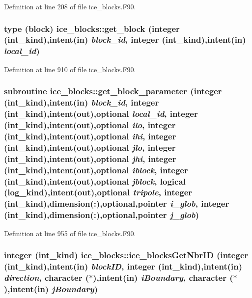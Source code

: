 Definition at line 208 of file ice\_\-blocks.F90.\hypertarget{namespaceice__blocks_aa79bfef5022683234ed1b332af17f1de}{
\subsubsection[{get\_\-block}]{\setlength{\rightskip}{0pt plus 5cm}type ({\bf block}) ice\_\-blocks::get\_\-block (integer (int\_\-kind),intent(in) {\em block\_\-id}, \/  integer (int\_\-kind),intent(in) {\em local\_\-id})}}
\label{namespaceice__blocks_aa79bfef5022683234ed1b332af17f1de}


Definition at line 910 of file ice\_\-blocks.F90.\hypertarget{namespaceice__blocks_adbbafad5aa62ed6d9fec1934f073d23e}{
\subsubsection[{get\_\-block\_\-parameter}]{\setlength{\rightskip}{0pt plus 5cm}subroutine ice\_\-blocks::get\_\-block\_\-parameter (integer (int\_\-kind),intent(in) {\em block\_\-id}, \/  integer (int\_\-kind),intent(out),optional {\em local\_\-id}, \/  integer (int\_\-kind),intent(out),optional {\em ilo}, \/  integer (int\_\-kind),intent(out),optional {\em ihi}, \/  integer (int\_\-kind),intent(out),optional {\em jlo}, \/  integer (int\_\-kind),intent(out),optional {\em jhi}, \/  integer (int\_\-kind),intent(out),optional {\em iblock}, \/  integer (int\_\-kind),intent(out),optional {\em jblock}, \/  logical (log\_\-kind),intent(out),optional {\em tripole}, \/  integer (int\_\-kind),dimension(:),optional,pointer {\em i\_\-glob}, \/  integer (int\_\-kind),dimension(:),optional,pointer {\em j\_\-glob})}}
\label{namespaceice__blocks_adbbafad5aa62ed6d9fec1934f073d23e}


Definition at line 955 of file ice\_\-blocks.F90.\hypertarget{namespaceice__blocks_a62de204811a079f1cccdcc957f0cb1ff}{
\subsubsection[{ice\_\-blocksGetNbrID}]{\setlength{\rightskip}{0pt plus 5cm}integer (int\_\-kind) ice\_\-blocks::ice\_\-blocksGetNbrID (integer (int\_\-kind),intent(in) {\em blockID}, \/  integer (int\_\-kind),intent(in) {\em direction}, \/  character ($\ast$),intent(in) {\em iBoundary}, \/  character ($\ast$),intent(in) {\em jBoundary})}}
\label{namespaceice__blocks_a62de204811a079f1cccdcc957f0cb1ff}


